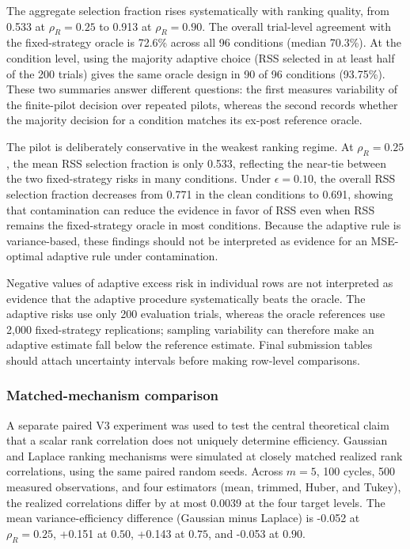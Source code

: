 \documentclass[12pt]{article}
\begin{document}
The aggregate selection fraction rises systematically with ranking quality, from 0.533 at $\rho_R=0.25$ to 0.913 at $\rho_R=0.90$. The overall trial-level agreement with the fixed-strategy oracle is 72.6\% across all 96 conditions (median 70.3\%). At the condition level, using the majority adaptive choice (RSS selected in at least half of the 200 trials) gives the same oracle design in 90 of 96 conditions (93.75\%). These two summaries answer different questions: the first measures variability of the finite-pilot decision over repeated pilots, whereas the second records whether the majority decision for a condition matches its ex-post reference oracle.

The pilot is deliberately conservative in the weakest ranking regime. At $\rho_R=0.25$, the mean RSS selection fraction is only 0.533, reflecting the near-tie between the two fixed-strategy risks in many conditions. Under $\epsilon=0.10$, the overall RSS selection fraction decreases from 0.771 in the clean conditions to 0.691, showing that contamination can reduce the evidence in favor of RSS even when RSS remains the fixed-strategy oracle in most conditions. Because the adaptive rule is variance-based, these findings should not be interpreted as evidence for an MSE-optimal adaptive rule under contamination.

Negative values of adaptive excess risk in individual rows are not interpreted as evidence that the adaptive procedure systematically beats the oracle. The adaptive risks use only 200 evaluation trials, whereas the oracle references use 2,000 fixed-strategy replications; sampling variability can therefore make an adaptive estimate fall below the reference estimate. Final submission tables should attach uncertainty intervals before making row-level comparisons.

\subsubsection{Matched-mechanism comparison}
A separate paired V3 experiment was used to test the central theoretical claim that a scalar rank correlation does not uniquely determine efficiency. Gaussian and Laplace ranking mechanisms were simulated at closely matched realized rank correlations, using the same paired random seeds. Across $m=5$, 100 cycles, 500 measured observations, and four estimators (mean, trimmed, Huber, and Tukey), the realized correlations differ by at most 0.0039 at the four target levels. The mean variance-efficiency difference (Gaussian minus Laplace) is -0.052 at $\rho_R=0.25$, +0.151 at $0.50$, +0.143 at $0.75$, and -0.053 at $0.90$.
\end{document}
